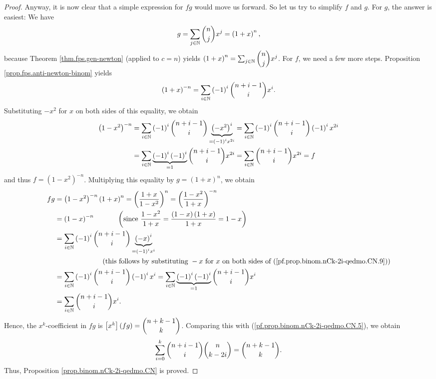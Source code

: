 \begin{proof}
Anyway, it is now clear that a simple expression for $fg$ would move us
forward. So let us try to simplify $f$ and $g$. For $g$, the answer is
easiest: We have%
\[
g=\sum_{j\in\mathbb{N}}\dbinom{n}{j}x^{j}=\left(  1+x\right)  ^{n},
\]
because Theorem \ref{thm.fps.gen-newton} (applied to $c=n$) yields $\left(
1+x\right)  ^{n}=\sum_{j\in\mathbb{N}}\dbinom{n}{j}x^{j}$. For $f$, we need a
few more steps. Proposition \ref{prop.fps.anti-newton-binom} yields%
\begin{equation}
\left(  1+x\right)  ^{-n}=\sum_{i\in\mathbb{N}}\left(  -1\right)  ^{i}%
\dbinom{n+i-1}{i}x^{i}. \label{pf.prop.binom.nCk-2i-qedmo.CN.9}%
\end{equation}
Substituting $-x^{2}$ for $x$ on both sides of this equality, we obtain%
\begin{align*}
\left(  1-x^{2}\right)  ^{-n}  &  =\sum_{i\in\mathbb{N}}\left(  -1\right)
^{i}\dbinom{n+i-1}{i}\underbrace{\left(  -x^{2}\right)  ^{i}}_{=\left(
-1\right)  ^{i}x^{2i}}=\sum_{i\in\mathbb{N}}\left(  -1\right)  ^{i}%
\dbinom{n+i-1}{i}\left(  -1\right)  ^{i}x^{2i}\\
&  =\sum_{i\in\mathbb{N}}\underbrace{\left(  -1\right)  ^{i}\left(  -1\right)
^{i}}_{=1}\dbinom{n+i-1}{i}x^{2i}=\sum_{i\in\mathbb{N}}\dbinom{n+i-1}{i}%
x^{2i}=f
\end{align*}
and thus $f=\left(  1-x^{2}\right)  ^{-n}$. Multiplying this equality by
$g=\left(  1+x\right)  ^{n}$, we obtain%
\begin{align*}
fg  &  =\left(  1-x^{2}\right)  ^{-n}\left(  1+x\right)  ^{n}=\left(
\dfrac{1+x}{1-x^{2}}\right)  ^{n}=\left(  \dfrac{1-x^{2}}{1+x}\right)  ^{-n}\\
&  =\left(  1-x\right)  ^{-n}\ \ \ \ \ \ \ \ \ \ \left(  \text{since }%
\dfrac{1-x^{2}}{1+x}=\dfrac{\left(  1-x\right)  \left(  1+x\right)  }%
{1+x}=1-x\right) \\
&  =\sum_{i\in\mathbb{N}}\left(  -1\right)  ^{i}\dbinom{n+i-1}{i}%
\underbrace{\left(  -x\right)  ^{i}}_{=\left(  -1\right)  ^{i}x^{i}}\\
&  \ \ \ \ \ \ \ \ \ \ \ \ \ \ \ \ \ \ \ \ \left(  \text{this follows by
substituting }-x\text{ for }x\text{ on both sides of
(\ref{pf.prop.binom.nCk-2i-qedmo.CN.9})}\right) \\
&  =\sum_{i\in\mathbb{N}}\left(  -1\right)  ^{i}\dbinom{n+i-1}{i}\left(
-1\right)  ^{i}x^{i}=\sum_{i\in\mathbb{N}}\underbrace{\left(  -1\right)
^{i}\left(  -1\right)  ^{i}}_{=1}\dbinom{n+i-1}{i}x^{i}\\
&  =\sum_{i\in\mathbb{N}}\dbinom{n+i-1}{i}x^{i}.
\end{align*}
Hence, the $x^{k}$-coefficient in $fg$ is $\left[  x^{k}\right]  \left(
fg\right)  =\dbinom{n+k-1}{k}$. Comparing this with
(\ref{pf.prop.binom.nCk-2i-qedmo.CN.5}), we obtain%
\[
\sum_{i=0}^{k}\dbinom{n+i-1}{i}\dbinom{n}{k-2i}=\dbinom{n+k-1}{k}.
\]
Thus, Proposition \ref{prop.binom.nCk-2i-qedmo.CN} is proved.
\end{proof}
